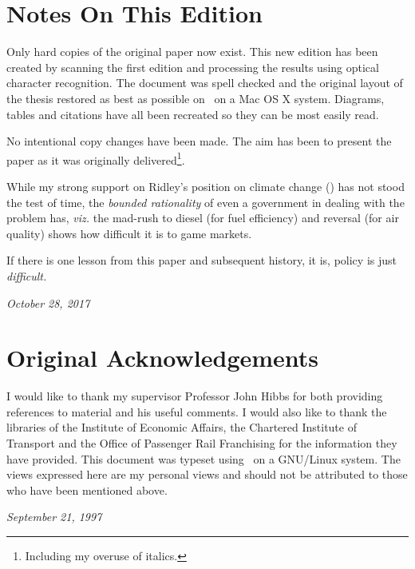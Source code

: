 \thispagestyle{plain}
\section{Notes On This Edition}

Only hard copies of the original paper now exist. This new edition has been created by scanning the first edition and processing the results using optical character recognition. The document was spell checked and the original layout of the thesis restored as best as possible on \XeLaTeX \ on a Mac OS X system. Diagrams, tables and citations have all been recreated so they can be most easily read.

No intentional copy changes have been made. The aim has been to present the paper as it was originally delivered\footnote{Including my overuse of italics.}.

While my strong support on Ridley's position on climate change (\citep{Ridley:1996}) has not stood the test of time, the \textit{bounded rationality} of even a government in dealing with the problem has, \textit{viz.} the mad-rush to diesel (for fuel efficiency) and reversal (for air quality) shows how difficult it is to game markets. 

If there is one lesson from this paper and subsequent history, it is, policy is just \textit{difficult.}

\textit{October 28, 2017}

\section{Original Acknowledgements}

I would like to thank my supervisor Professor John Hibbs for both providing references to material and his useful comments. I would also like to thank the libraries of the Institute of Economic Affairs, the Chartered Institute of Transport and the Office of Passenger Rail Franchising for the information they have provided. This document was typeset using \LaTeXe  \ on a GNU/Linux system. The views expressed here are my personal views and should not be attributed to those who have been mentioned above.

\textit{September 21, 1997}